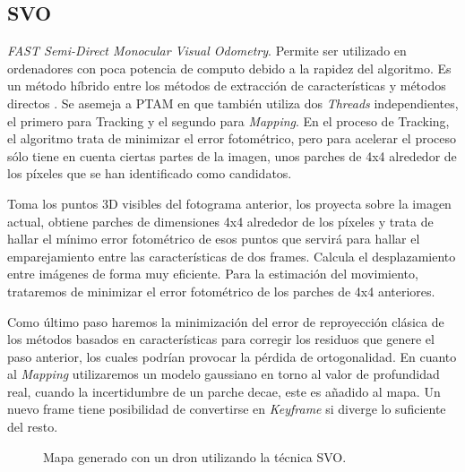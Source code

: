 \subsection{SVO}
\textit{FAST Semi-Direct Monocular Visual Odometry}.
Permite ser utilizado en ordenadores con poca potencia de computo debido a la rapidez del algoritmo.
Es un método híbrido entre los métodos de extracción de características y métodos directos
\cite{Forster2017svo}. 
Se asemeja a PTAM en que también utiliza dos \textit{Threads} independientes, el primero para Tracking y el segundo para \textit{Mapping}.
En el proceso de Tracking, el algoritmo trata de minimizar el error fotométrico, pero para acelerar el proceso sólo tiene en cuenta ciertas partes de la imagen, unos parches de 4x4 alrededor de los píxeles que se han identificado como candidatos.

Toma los puntos 3D visibles del fotograma anterior, los proyecta sobre la imagen actual, obtiene parches de dimensiones 4x4 alrededor de los píxeles y trata de hallar  el mínimo error fotométrico de esos puntos que servirá para hallar el emparejamiento entre las características de dos frames. Calcula el desplazamiento entre imágenes de forma muy eficiente.
Para la estimación del movimiento, trataremos de minimizar el error fotométrico de los parches de 4x4 anteriores.


 Como último paso haremos la minimización del error de reproyección clásica de los métodos basados en características para corregir los residuos que genere el paso anterior, los cuales podrían provocar la pérdida de ortogonalidad.
En cuanto al \textit{Mapping} utilizaremos un modelo gaussiano en torno al valor de profundidad real, cuando la incertidumbre de un parche decae, este es añadido al mapa.
Un nuevo frame tiene posibilidad de convertirse en \textit{Keyframe} si diverge lo suficiente del resto.

\begin{figure}[H]
\begin{center}
\end{center}
\caption{Mapa generado con un dron utilizando la técnica SVO.}
\end{figure}


